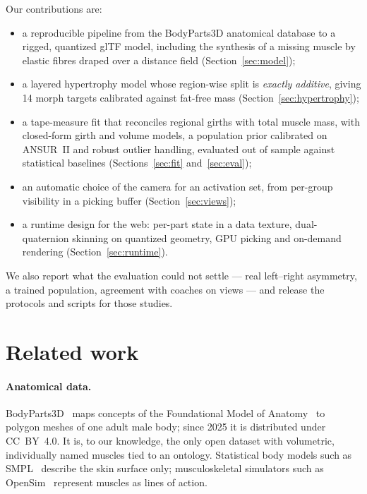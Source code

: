 \documentclass[10pt,twocolumn]{article}
\begin{document}
Our contributions are:
\begin{itemize}\itemsep1pt
\item a reproducible pipeline from the BodyParts3D anatomical database to a rigged, quantized glTF
  model, including the synthesis of a missing muscle by elastic fibres draped over a distance field
  (Section~\ref{sec:model});
\item a layered hypertrophy model whose region-wise split is \emph{exactly additive}, giving 14 morph
  targets calibrated against fat-free mass (Section~\ref{sec:hypertrophy});
\item a tape-measure fit that reconciles regional girths with total muscle mass, with closed-form
  girth and volume models, a population prior calibrated on ANSUR~II and robust outlier handling,
  evaluated out of sample against statistical baselines (Sections~\ref{sec:fit} and~\ref{sec:eval});
\item an automatic choice of the camera for an activation set, from per-group visibility in a
  picking buffer (Section~\ref{sec:views});
\item a runtime design for the web: per-part state in a data texture, dual-quaternion skinning on
  quantized geometry, GPU picking and on-demand rendering (Section~\ref{sec:runtime}).
\end{itemize}
We also report what the evaluation could not settle --- real left--right asymmetry, a trained
population, agreement with coaches on views --- and release the protocols and scripts for those
studies.

\section{Related work}

\paragraph{Anatomical data.}
BodyParts3D~\cite{mitsuhashi2009bodyparts3d} maps concepts of the Foundational Model of
Anatomy~\cite{rosse2003fma} to polygon meshes of one adult male body; since 2025 it is distributed
under CC~BY~4.0. It is, to our knowledge, the only open dataset with volumetric, individually named
muscles tied to an ontology. Statistical body models such as SMPL~\cite{loper2015smpl} describe the
skin surface only; musculoskeletal simulators such as OpenSim~\cite{delp2007opensim} represent
muscles as lines of action.
\end{document}
